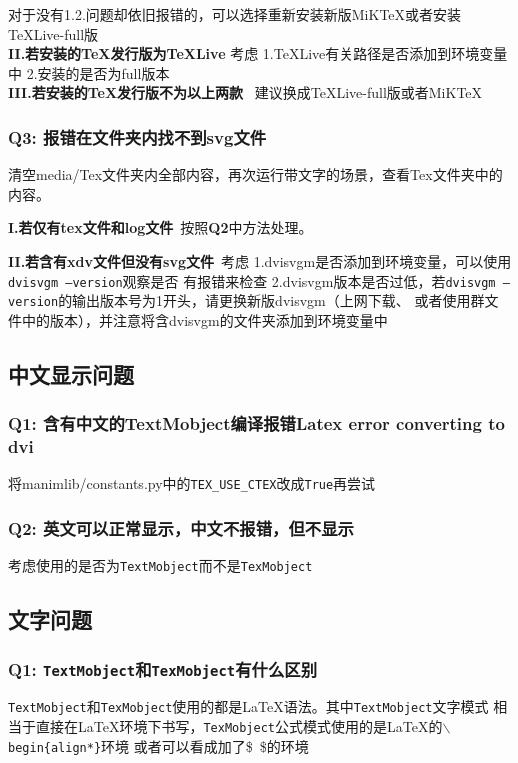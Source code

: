 \documentclass[UTF8]{ctexart}
\begin{document}
对于没有1.2.问题却依旧报错的，可以选择重新安装新版MiK\TeX 或者安装\TeX Live-full版\\

\textbf{II.若安装的\TeX 发行版为\TeX Live}
考虑 1.\TeX Live有关路径是否添加到环境变量中 2.安装的是否为full版本\\

\textbf{III.若安装的\TeX 发行版不为以上两款}
\ 建议换成\TeX Live-full版或者MiK\TeX

\subsubsection*{Q3: 报错在文件夹内找不到svg文件}
清空media/Tex文件夹内全部内容，再次运行带文字的场景，查看Tex文件夹中的内容。

\textbf{I.若仅有tex文件和log文件}\ 按照\textbf{Q2}中方法处理。

\textbf{II.若含有xdv文件但没有svg文件}\ 考虑 1.dvisvgm是否添加到环境变量，可以使用\texttt{dvisvgm --version}观察是否
有报错来检查 2.dvisvgm版本是否过低，若\texttt{dvisvgm --version}的输出版本号为1开头，请更换新版dvisvgm（上网下载、
或者使用群文件中的版本），并注意将含dvisvgm的文件夹添加到环境变量中

\subsection{中文显示问题}
\subsubsection*{Q1: 含有中文的TextMobject编译报错Latex error converting to dvi}
将manimlib/constants.py中的\texttt{TEX\_USE\_CTEX}改成\texttt{True}再尝试

\subsubsection*{Q2: 英文可以正常显示，中文不报错，但不显示}
考虑使用的是否为\texttt{TextMobject}而不是\texttt{TexMobject}

\subsection{文字问题}
\subsubsection*{Q1: \texttt{TextMobject}和\texttt{TexMobject}有什么区别}
\texttt{TextMobject}和\texttt{TexMobject}使用的都是\LaTeX 语法。其中\texttt{TextMobject}文字模式
相当于直接在\LaTeX 环境下书写，\texttt{TexMobject}公式模式使用的是\LaTeX 的\texttt{$\backslash$begin\{align*\}}环境
或者可以看成加了\$\ \$的环境
\end{document}
